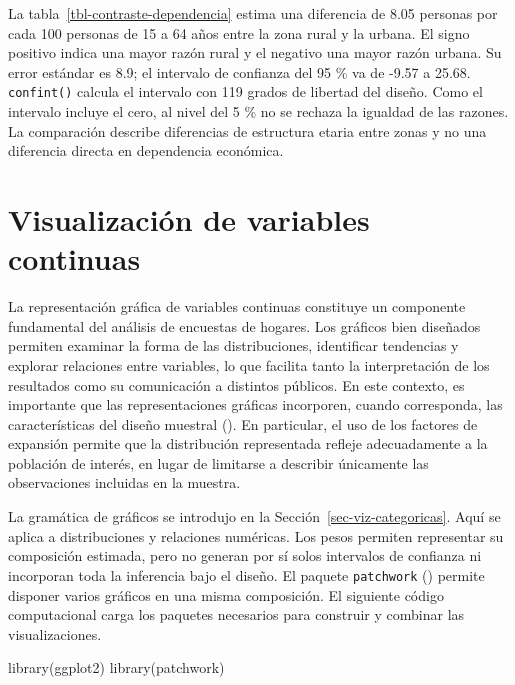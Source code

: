 \documentclass[
  spanish,
  11pt,
  letterpaper,
  oneside,
  open=any]{scrbook}
\newenvironment{Shaded}{\begin{snugshade}}{\end{snugshade}}
\newcommand{\FunctionTok}[1]{\textcolor[rgb]{0.28,0.35,0.67}{#1}}
\newcommand{\NormalTok}[1]{\textcolor[rgb]{0.00,0.23,0.31}{#1}}
\begin{document}
La tabla~\ref{tbl-contraste-dependencia} estima una diferencia de 8.05
personas por cada 100 personas de 15 a 64 años entre la zona rural y la
urbana. El signo positivo indica una mayor razón rural y el negativo una
mayor razón urbana. Su error estándar es 8.9; el intervalo de confianza
del 95 \% va de -9.57 a 25.68. \texttt{confint()} calcula el intervalo
con 119 grados de libertad del diseño. Como el intervalo incluye el
cero, al nivel del 5 \% no se rechaza la igualdad de las razones. La
comparación describe diferencias de estructura etaria entre zonas y no
una diferencia directa en dependencia económica.

\section{Visualización de variables continuas}\label{viz-continuas}

La representación gráfica de variables continuas constituye un
componente fundamental del análisis de encuestas de hogares. Los
gráficos bien diseñados permiten examinar la forma de las
distribuciones, identificar tendencias y explorar relaciones entre
variables, lo que facilita tanto la interpretación de los resultados
como su comunicación a distintos públicos. En este contexto, es
importante que las representaciones gráficas incorporen, cuando
corresponda, las características del diseño muestral
(). En particular, el uso de los
factores de expansión permite que la distribución representada refleje
adecuadamente a la población de interés, en lugar de limitarse a
describir únicamente las observaciones incluidas en la muestra.

La gramática de gráficos se introdujo en la
Sección~\ref{sec-viz-categoricas}. Aquí se aplica a distribuciones y
relaciones numéricas. Los pesos permiten representar su composición
estimada, pero no generan por sí solos intervalos de confianza ni
incorporan toda la inferencia bajo el diseño. El paquete
\texttt{patchwork} () permite
disponer varios gráficos en una misma composición. El siguiente código
computacional carga los paquetes necesarios para construir y combinar
las visualizaciones.

\begin{Shaded}
\begin{Highlighting}[]
\FunctionTok{library}\NormalTok{(ggplot2)}
\FunctionTok{library}\NormalTok{(patchwork)}
\end{Highlighting}
\end{Shaded}
\end{document}
